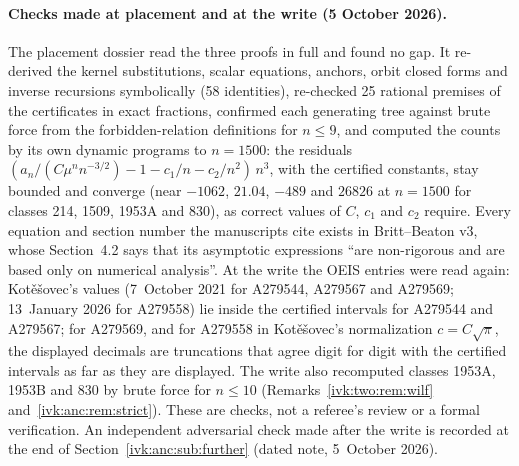 \documentclass[11pt,letterpaper]{article}
\theoremstyle{remark}\newtheorem{remark}[theorem]{Remark}
\begin{document}
\paragraph{Checks made at placement and at the write (5 October 2026).}
The placement dossier read the three proofs in full and found no gap. It re-derived the kernel substitutions, scalar equations, anchors, orbit closed forms and inverse recursions symbolically (58 identities), re-checked 25 rational premises of the certificates in exact fractions, confirmed each generating tree against brute force from the forbidden-relation definitions for $n\le9$, and computed the counts by its own dynamic programs to $n=1500$: the residuals $(a_n/(C\mu^nn^{-3/2})-1-c_1/n-c_2/n^2)\,n^3$, with the certified constants, stay bounded and converge (near $-1062$, $21.04$, $-489$ and $26826$ at $n=1500$ for classes 214, 1509, 1953A and 830), as correct values of $C$, $c_1$ and $c_2$ require. Every equation and section number the manuscripts cite exists in Britt--Beaton v3, whose Section~4.2 says that its asymptotic expressions ``are non-rigorous and are based only on numerical analysis''. At the write the OEIS entries were read again: Kot\v{e}\v{s}ovec's values (7~October 2021 for A279544, A279567 and A279569; 13~January 2026 for A279558) lie inside the certified intervals for A279544 and A279567; for A279569, and for A279558 in Kot\v{e}\v{s}ovec's normalization $c=C\sqrt\pi$, the displayed decimals are truncations that agree digit for digit with the certified intervals as far as they are displayed. The write also recomputed classes 1953A, 1953B and 830 by brute force for $n\le10$ (Remarks~\ref{ivk:two:rem:wilf} and~\ref{ivk:anc:rem:strict}). These are checks, not a referee's review or a formal verification. An independent adversarial check made after the write is recorded at the end of Section~\ref{ivk:anc:sub:further} (dated note, 5~October 2026).
\end{document}
